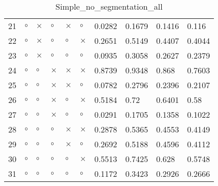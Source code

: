 \begin{table}[H]
\begin{tabular}{|P{0.7cm}|P{1.3cm}P{1.3cm}P{1.3cm}P{1.3cm}P{1.3cm}|P{1.1cm}P{1.1cm}P{1.1cm}P{1.1cm}|}
  21 &  $\circ$ & $\times$ &  $\circ$ & $\times$ &     $\circ$ &          0.0282 &          0.1679 &         0.1416 &           0.116 \\
  22 &  $\circ$ & $\times$ &  $\circ$ &  $\circ$ &    $\times$ &          0.2651 &          0.5149 &         0.4407 &          0.4044 \\
  23 &  $\circ$ & $\times$ &  $\circ$ &  $\circ$ &     $\circ$ &          0.0935 &          0.3058 &         0.2627 &          0.2379 \\
  24 &  $\circ$ &  $\circ$ & $\times$ & $\times$ &    $\times$ &          0.8739 &          0.9348 &          0.868 &          0.7603 \\
  25 &  $\circ$ &  $\circ$ & $\times$ & $\times$ &     $\circ$ &          0.0782 &          0.2796 &         0.2396 &          0.2107 \\
  26 &  $\circ$ &  $\circ$ & $\times$ &  $\circ$ &    $\times$ &          0.5184 &            0.72 &         0.6401 &            0.58 \\
  27 &  $\circ$ &  $\circ$ & $\times$ &  $\circ$ &     $\circ$ &          0.0291 &          0.1705 &         0.1358 &          0.1022 \\
  28 &  $\circ$ &  $\circ$ &  $\circ$ & $\times$ &    $\times$ &          0.2878 &          0.5365 &         0.4553 &          0.4149 \\
  29 &  $\circ$ &  $\circ$ &  $\circ$ & $\times$ &     $\circ$ &          0.2692 &          0.5188 &         0.4596 &          0.4112 \\
  30 &  $\circ$ &  $\circ$ &  $\circ$ &  $\circ$ &    $\times$ &          0.5513 &          0.7425 &          0.628 &          0.5748 \\
  31 &  $\circ$ &  $\circ$ &  $\circ$ &  $\circ$ &     $\circ$ &          0.1172 &          0.3423 &         0.2926 &          0.2666 \\
\hline
\end{tabular}
\caption{Simple_no_segmentation_all}
\label{tab:}
\end{table}
